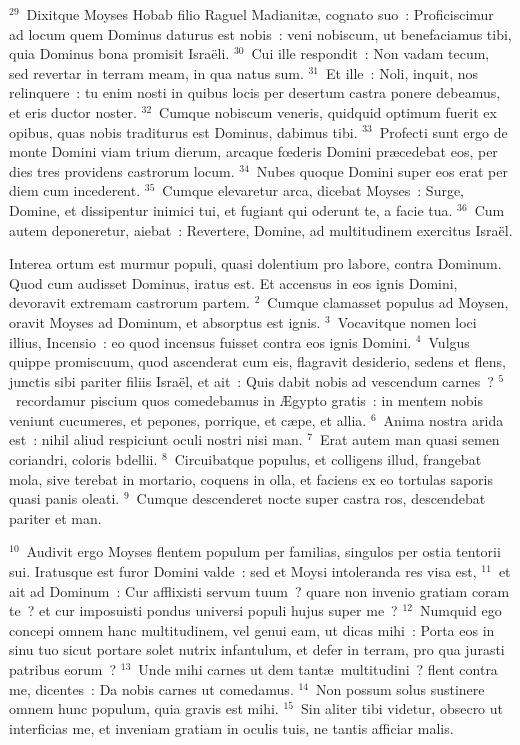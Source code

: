 ${}^{29}$~Dixitque Moyses Hobab filio Raguel Madianit\ae , cognato suo~: Proficiscimur ad locum quem Dominus daturus est nobis~: veni nobiscum, ut benefaciamus tibi, quia Dominus bona promisit Isra\"eli.
${}^{30}$~Cui ille respondit~: Non vadam tecum, sed revertar in terram meam, in qua natus sum.
${}^{31}$~Et ille~: Noli, inquit, nos relinquere~: tu enim nosti in quibus locis per desertum castra ponere debeamus, et eris ductor noster.
${}^{32}$~Cumque nobiscum veneris, quidquid optimum fuerit ex opibus, quas nobis traditurus est Dominus, dabimus tibi.
${}^{33}$~Profecti sunt ergo de monte Domini viam trium dierum, arcaque fœderis Domini pr\ae cedebat eos, per dies tres providens castrorum locum.
${}^{34}$~Nubes quoque Domini super eos erat per diem cum incederent.
${}^{35}$~Cumque elevaretur arca, dicebat Moyses~: Surge, Domine, et dissipentur inimici tui, et fugiant qui oderunt te, a facie tua.
${}^{36}$~Cum autem deponeretur, aiebat~: Revertere, Domine, ad multitudinem exercitus Isra\"el.

\lettrine[lines=3,image=true,loversize=0.05,lraise=-0.03]{I}{}nterea ortum est murmur populi, quasi dolentium pro labore, contra Dominum. Quod cum audisset Dominus, iratus est. Et accensus in eos ignis Domini, devoravit extremam castrorum partem.
${}^{2}$~Cumque clamasset populus ad Moysen, oravit Moyses ad Dominum, et absorptus est ignis.
${}^{3}$~Vocavitque nomen loci illius, Incensio~: eo quod incensus fuisset contra eos ignis Domini.
${}^{4}$~Vulgus quippe promiscuum, quod ascenderat cum eis, flagravit desiderio, sedens et flens, junctis sibi pariter filiis Isra\"el, et ait~: Quis dabit nobis ad vescendum carnes~?
${}^{5}$~recordamur piscium quos comedebamus in \AE gypto gratis~: in mentem nobis veniunt cucumeres, et pepones, porrique, et c\ae pe, et allia.
${}^{6}$~Anima nostra arida est~: nihil aliud respiciunt oculi nostri nisi man.
${}^{7}$~Erat autem man quasi semen coriandri, coloris bdellii.
${}^{8}$~Circuibatque populus, et colligens illud, frangebat mola, sive terebat in mortario, coquens in olla, et faciens ex eo tortulas saporis quasi panis oleati.
${}^{9}$~Cumque descenderet nocte super castra ros, descendebat pariter et man.


${}^{10}$~Audivit ergo Moyses flentem populum per familias, singulos per ostia tentorii sui. Iratusque est furor Domini valde~: sed et Moysi intoleranda res visa est,
${}^{11}$~et ait ad Dominum~: Cur afflixisti servum tuum~? quare non invenio gratiam coram te~? et cur imposuisti pondus universi populi hujus super me~?
${}^{12}$~Numquid ego concepi omnem hanc multitudinem, vel genui eam, ut dicas mihi~: Porta eos in sinu tuo sicut portare solet nutrix infantulum, et defer in terram, pro qua jurasti patribus eorum~?
${}^{13}$~Unde mihi carnes ut dem tant\ae\ multitudini~? flent contra me, dicentes~: Da nobis carnes ut comedamus.
${}^{14}$~Non possum solus sustinere omnem hunc populum, quia gravis est mihi.
${}^{15}$~Sin aliter tibi videtur, obsecro ut interficias me, et inveniam gratiam in oculis tuis, ne tantis afficiar malis.


